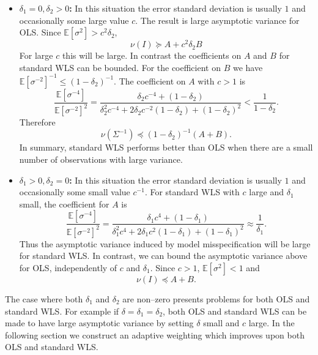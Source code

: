 \documentclass[ejs,ps,preprint]{imsart}
\numberwithin{equation}{section}
\theoremstyle{plain}
\newcommand{\E}{\mathbb{E}}
\def\E{\mathbb{E}}
\begin{document}
\begin{itemize}
\item \textbf{$\delta_1=0, \delta_2 > 0$:} In this situation the error standard deviation is usually $1$ and occasionally some large value $c$. The result is large asymptotic variance for OLS. Since $\E[\sigma^2] > c^2\delta_2$, 
\begin{equation*}
\nu(I) \succeq A + c^2\delta_2B
\end{equation*}
For large $c$ this will be large. In contrast the coefficients on $A$ and $B$ for standard WLS can be bounded. For the coefficient on $B$ we have $\E[\sigma^{-2}]^{-1} \leq (1-\delta_2)^{-1}$. The coefficient on $A$ with $c > 1$ is
\begin{equation*}
\frac{\E[\sigma^{-4}]}{\E[\sigma^{-2}]^2} = \frac{\delta_2c^{-4} + (1-\delta_2)}{\delta_2^2c^{-4} + 2\delta_2c^{-2}(1-\delta_2) + (1-\delta_2)^2} < \frac{1}{1-\delta_2}.
\end{equation*}
Therefore
\begin{equation*}
\nu(\Sigma^{-1}) \preceq (1-\delta_2)^{-1}(A + B). 
\end{equation*}
In summary, standard WLS performs better than OLS when there are a small number of observations with large variance.
\item \textbf{$\delta_1>0,\delta_2=0$:} In this situation the error standard deviation is usually $1$ and occasionally some small value $c^{-1}$. For standard WLS with $c$ large and $\delta_1$ small, the coefficient for $A$ is
\begin{equation*}
\frac{\E[\sigma^{-4}]}{\E[\sigma^{-2}]^2} = \frac{\delta_1c^4 + (1-\delta_1)}{\delta_1^2c^4 + 2\delta_1c^2(1-\delta_1) + (1-\delta_1)^2} \approx \frac{1}{\delta_1}.
\end{equation*}
Thus the asymptotic variance induced by model misspecification will be large for standard WLS. In contrast, we can bound the asymptotic variance above for OLS, independently of $c$ and $\delta_1$. Since $c > 1$, $\E[\sigma^2] < 1$ and 
\begin{equation*}
\nu(I) \preceq A + B.
\end{equation*}
\end{itemize}
The case where both $\delta_1$ and $\delta_2$ are non--zero presents problems for both OLS and standard WLS. For example if $\delta = \delta_1 = \delta_2$, both OLS and standard WLS can be made to have large asymptotic variance by setting $\delta$ small and $c$ large. In the following section we construct an adaptive weighting which improves upon both OLS and standard WLS.
\end{document}
